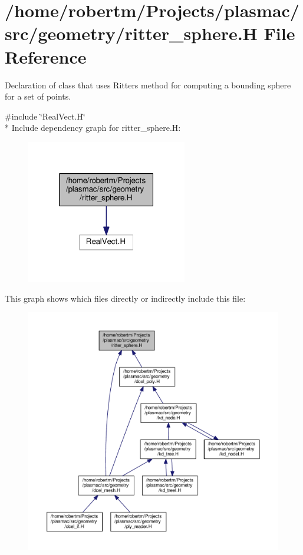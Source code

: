 \hypertarget{ritter__sphere_8H}{}\section{/home/robertm/\+Projects/plasmac/src/geometry/ritter\+\_\+sphere.H File Reference}
\label{ritter__sphere_8H}


Declaration of class that uses Ritter\textquotesingle{}s method for computing a bounding sphere for a set of points.  


{\ttfamily \#include \char`\"{}Real\+Vect.\+H\char`\"{}}\\*
Include dependency graph for ritter\+\_\+sphere.\+H\+:\nopagebreak
\begin{figure}[H]
\begin{center}
\leavevmode
\includegraphics[width=199pt]{ritter__sphere_8H__incl}
\end{center}
\end{figure}
This graph shows which files directly or indirectly include this file\+:\nopagebreak
\begin{figure}[H]
\begin{center}
\leavevmode
\includegraphics[width=350pt]{ritter__sphere_8H__dep__incl}
\end{center}
\end{figure}
